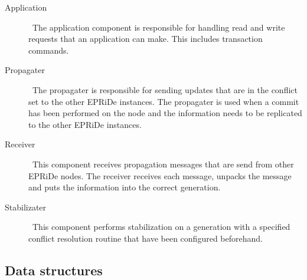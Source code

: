 \begin{description}
	\item[Application] \
		The application component is responsible for handling read and write requests that an application can make. This includes transaction commands.
		
	\item[Propagater] \
		The propagater is responsible for sending updates that are in the conflict set to the other EPRiDe instances. The propagater is used  when a commit has been performed on the node and the information needs to be replicated to the other EPRiDe instances.
		
	\item[Receiver] \
		This component receives propagation messages that are send from other EPRiDe nodes. The receiver receives each message, unpacks the message and puts the information into the correct generation.
		
	\item[Stabilizater] \
		This component performs stabilization on a generation with a specified conflict resolution routine that have been configured beforehand.
\end{description}


\subsection{Data structures} %
\label{sub:datastructures}

